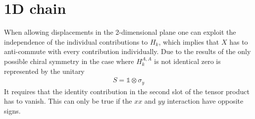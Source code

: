 \section{1D chain}
When allowing displacements in the 2-dimensional plane one can exploit the independence of the individual contributions to $H_k$, which implies that $X$ has to anti-commute with every contribution individually. Due to the results of  the only possible chiral symmetry in the case where $H_k^{A,A}$ is not identical zero is represented by the unitary
\begin{align*}
    S= \mathbb{1}\otimes\sigma_y
\end{align*}
It requires that the identity contribution in the second slot of the tensor product has to vanish. This can only be true if the $xx$ and $yy$ interaction have opposite signs.

